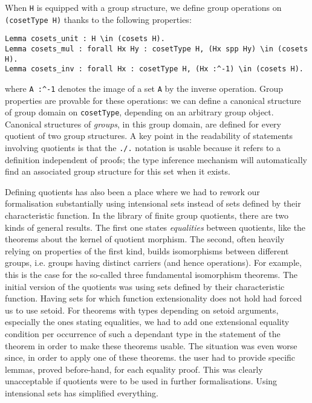 When \lstinline[basicstyle=\footnotesize]+H+ is equipped with a group structure, we define group
operations on \lstinline[basicstyle=\footnotesize]+(cosetType H)+ thanks to the following properties:
\begin{lstlisting}
Lemma cosets_unit : H \in (cosets H).
Lemma cosets_mul : forall Hx Hy : cosetType H, (Hx spp Hy) \in (cosets H).
Lemma cosets_inv : forall Hx : cosetType H, (Hx :^-1) \in (cosets H).
\end{lstlisting}
\noindent where \lstinline[basicstyle=\footnotesize]+A :^-1+ denotes the image of a set
\lstinline[basicstyle=\footnotesize]+A+ by the
inverse operation. Group properties are provable for these operations:
we can define a canonical structure of group domain on
\lstinline[basicstyle=\footnotesize]+cosetType+, depending on an arbitrary group
object. Canonical structures of \emph{groups}, in this group domain,
are defined for every quotient of two group structures. A key point in
the readability of statements involving quotients is that the
\lstinline[basicstyle=\footnotesize]+./.+ notation is usable because it refers to a definition
independent of proofs; the type inference mechanism will
automatically find an associated group structure for this set when it
exists.

Defining quotients has also been a place where we had to rework 
our formalisation substantially using intensional sets instead of sets defined
by their characteristic function. In the library of finite group quotients,
there are two kinds of general results. The first one states
\emph{equalities} between quotients, like the theorems about the kernel of quotient
morphism. The second, often heavily relying on properties of the first kind, builds
isomorphisms between different groups, i.e. groups having distinct
carriers (and hence operations). For example, this is the case for the
so-called three fundamental isomorphism theorems. 
The initial version of the quotients was using sets defined by their characteristic function.
Having sets
for which function extensionality does not hold had forced us to
use setoid.
For theorems with types depending on setoid arguments, especially the ones stating
equalities, we had to add  one extensional equality condition per occurrence
of such a dependant type in the statement of the theorem in order to make these
theorems usable. The situation was even worse since, in order to apply one of these theorems.
 the user had to provide specific lemmas, proved before-hand, for each equality proof.
This was clearly unacceptable if quotients were to be used in further
formalisations.
Using intensional sets has simplified everything.

